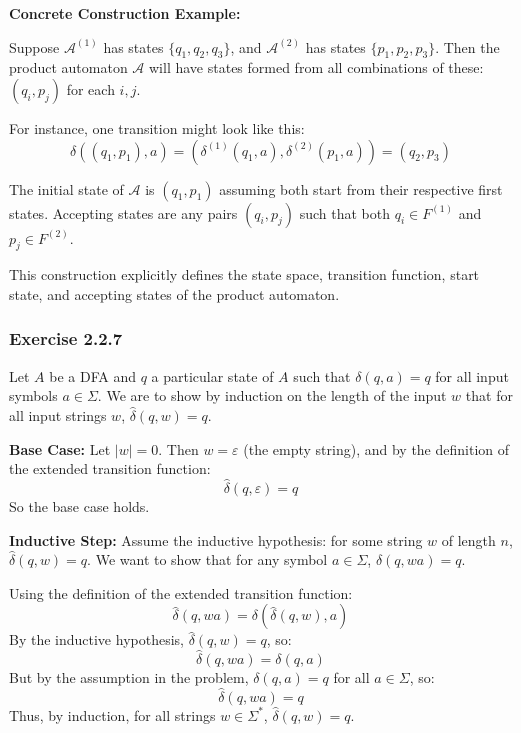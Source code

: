 \documentclass{article}
\theoremstyle{theorem}
\theoremstyle{definition}
\theoremstyle{remark}
\begin{document}
\smallskip

\textbf{Concrete Construction Example:}

Suppose \( \mathcal{A}^{(1)} \) has states \( \{q_1, q_2, q_3\} \), and \( \mathcal{A}^{(2)} \) has states \( \{p_1, p_2, p_3\} \). Then the product automaton \( \mathcal{A} \) will have states formed from all combinations of these: \( (q_i, p_j) \) for each \( i, j \).

For instance, one transition might look like this:
\[
\delta((q_1, p_1), a) = (\delta^{(1)}(q_1, a), \delta^{(2)}(p_1, a)) = (q_2, p_3)
\]

The initial state of \( \mathcal{A} \) is \( (q_1, p_1) \) assuming both start from their respective first states. Accepting states are any pairs \( (q_i, p_j) \) such that both \( q_i \in F^{(1)} \) and \( p_j \in F^{(2)} \).

This construction explicitly defines the state space, transition function, start state, and accepting states of the product automaton.


\bigskip

\subsubsection*{Exercise 2.2.7}

Let $A$ be a DFA and $q$ a particular state of $A$ such that $\delta(q, a) = q$ for all input symbols $a \in \Sigma$. We are to show by induction on the length of the input $w$ that for all input strings $w$, $\hat{\delta}(q, w) = q$.

\textbf{Base Case:} Let $|w| = 0$. Then $w = \varepsilon$ (the empty string), and by the definition of the extended transition function:
\[
\hat{\delta}(q, \varepsilon) = q
\]
So the base case holds.

\textbf{Inductive Step:} Assume the inductive hypothesis: for some string $w$ of length $n$, $\hat{\delta}(q, w) = q$. We want to show that for any symbol $a \in \Sigma$, $\hat{\delta}(q, wa) = q$.

Using the definition of the extended transition function:
\[
\hat{\delta}(q, wa) = \delta(\hat{\delta}(q, w), a)
\]
By the inductive hypothesis, $\hat{\delta}(q, w) = q$, so:
\[
\hat{\delta}(q, wa) = \delta(q, a)
\]
But by the assumption in the problem, $\delta(q, a) = q$ for all $a \in \Sigma$, so:
\[
\hat{\delta}(q, wa) = q
\]
Thus, by induction, for all strings $w \in \Sigma^*$, $\hat{\delta}(q, w) = q$.

\bigskip
\end{document}
